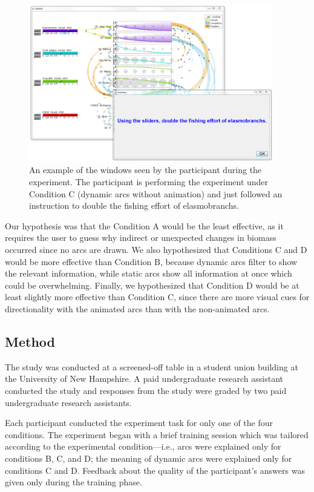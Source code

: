 \begin{figure}[h]
	\centering
	\includegraphics[width=0.95\textwidth]{figures/png/experiment.png}
	\caption[An example of the windows seen by the participant during the experiment]{An example of the windows seen by the participant during the experiment.  The participant is performing the experiment under Condition C (dynamic arcs without animation) and just followed an instruction to double the fishing effort of elasmobranchs.}
	\label{fig:experiment}
\end{figure}

Our hypothesis was that the Condition A would be the least effective, as it requires the user to guess why indirect or unexpected changes in biomass occurred since no arcs are drawn.  We also hypothesized that Conditions C and D would be more effective than Condition B, because dynamic arcs filter to show the relevant information, while static arcs show all information at once which could be overwhelming.  Finally, we hypothesized that Condition D would be at least slightly more effective than Condition C, since there are more visual cues for directionality with the animated arcs than with the non-animated arcs.

\subsection{Method}

The study was conducted at a screened-off table in a student union building at the University of New Hampshire.  A paid undergraduate research assistant conducted the study and responses from the study were graded by two paid undergraduate research assistants.

Each participant conducted the experiment task for only one of the four conditions.  The experiment began with a brief training session which was tailored according to the experimental condition---i.e., arcs were explained only for conditions B, C, and D; the meaning of dynamic arcs were explained only for conditions C and D.  Feedback about the quality of the participant's answers was given only during the training phase.  

